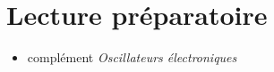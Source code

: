 \documentclass[canadien,12pt,oneside,letterpaper]{article}
\begin{document}
\section{Lecture préparatoire}
\vspace{-1ex}
\begin{itemize}
\item complément \textit{Oscillateurs électroniques}
\end{itemize}


\end{document}

